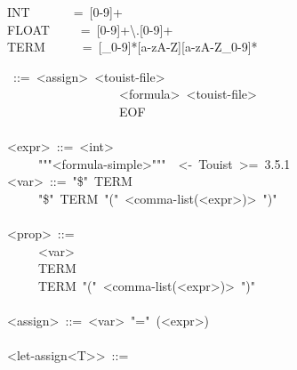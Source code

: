 \begin{footnotesize}

\begin{mdpre}%
\noindent INT~~~~~~~=~{}[0-9]+\\
FLOAT~~~~~=~{}[0-9]+\textbackslash{}.{}[0-9]+\\
TERM~~~~~~=~{}[\_0-9]*{}[a-zA-Z]{}[a-zA-Z\_0-9]*%
\end{mdpre}\begin{mdpre}%
~::=~{\textless{}assign\textgreater{}}~{\textless{}touist-file\textgreater{}}\\
~~~~~~~~~~~~~~~~~\textbar{}~{\textless{}formula\textgreater{}}~{\textless{}touist-file\textgreater{}}\\
~~~~~~~~~~~~~~~~~\textbar{}~EOF\\
\\
{\textless{}expr\textgreater{}}~::=~{\textless{}int\textgreater{}}\\
~~~~\textbar{}~"""{\textless{}formula-simple\textgreater{}}"""~~{\textless{}-~Touist~\textgreater{}=~3.5.1}\\
{\textless{}var\textgreater{}}~::=~"\$"~TERM\\
~~~~\textbar{}~"\$"~TERM~"("~{\textless{}comma-list(\textless{}expr\textgreater{})\textgreater{}}~")"\\
\\
{\textless{}prop\textgreater{}}~::=\\
~~~~\textbar{}~{\textless{}var\textgreater{}}\\
~~~~\textbar{}~TERM\\
~~~~\textbar{}~TERM~"("~{\textless{}comma-list(\textless{}expr\textgreater{})\textgreater{}}~")"\\
\\
{\textless{}assign\textgreater{}}~::=~{\textless{}var\textgreater{}}~"="~({\textless{}expr\textgreater{}})\\
\\
{\textless{}let-assign\textless{}T\textgreater{}\textgreater{}}~::=\\

\end{mdpre}
\end{footnotesize}

